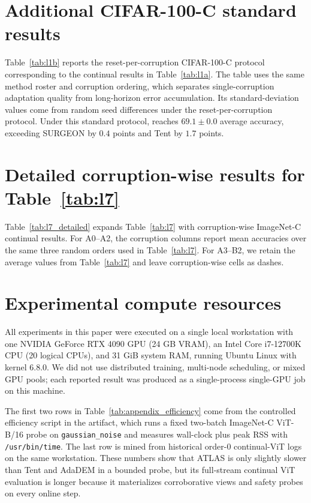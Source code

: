 \section{Additional CIFAR-100-C standard results}
\label{app:additional_cifar}

Table~\ref{tab:l1b} reports the reset-per-corruption CIFAR-100-C protocol corresponding to the continual results in Table~\ref{tab:l1a}. The table uses the same method roster and corruption ordering, which separates single-corruption adaptation quality from long-horizon error accumulation. Its standard-deviation values come from random seed differences under the reset-per-corruption protocol. Under this standard protocol, \method{} reaches $69.1\pm0.0$ average accuracy, exceeding SURGEON by $0.4$ points and Tent by $1.7$ points.




\section{Detailed corruption-wise results for Table~\ref{tab:l7}}
\label{app:ablation_details}

Table~\ref{tab:l7_detailed} expands Table~\ref{tab:l7} with corruption-wise ImageNet-C continual results. For A0--A2, the corruption columns report mean accuracies over the same three random orders used in Table~\ref{tab:l7}. For A3--B2, we retain the average values from Table~\ref{tab:l7} and leave corruption-wise cells as dashes.




\section{Experimental compute resources}
\label{app:compute_resources}

All experiments in this paper were executed on a single local workstation with one NVIDIA GeForce RTX 4090 GPU (24 GB VRAM), an Intel Core i7-12700K CPU (20 logical CPUs), and 31 GiB system RAM, running Ubuntu Linux with kernel 6.8.0. We did not use distributed training, multi-node scheduling, or mixed GPU pools; each reported result was produced as a single-process single-GPU job on this machine.



The first two rows in Table~\ref{tab:appendix_efficiency} come from the controlled efficiency script in the artifact, which runs a fixed two-batch ImageNet-C ViT-B/16 probe on \texttt{gaussian\_noise} and measures wall-clock plus peak RSS with \texttt{/usr/bin/time}. The last row is mined from historical order-0 continual-ViT logs on the same workstation. These numbers show that ATLAS is only slightly slower than Tent and AdaDEM in a bounded probe, but its full-stream continual ViT evaluation is longer because it materializes corroborative views and safety probes on every online step.
